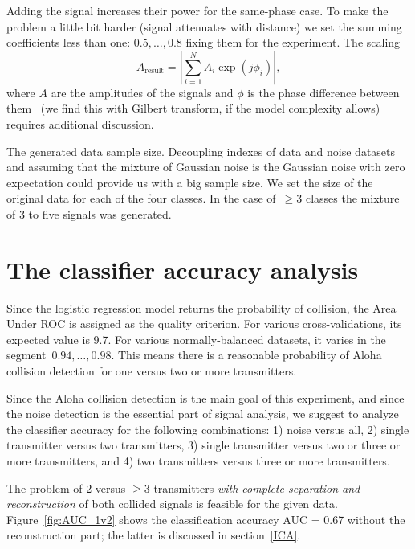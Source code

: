\documentclass[12pt]{article}
\begin{document}
Adding the signal increases their power for the same-phase case. To make the problem a little bit harder (signal attenuates with distance) we set the summing coefficients less than one: $0.5,\ldots,0.8$ fixing them for the experiment. The scaling \[A_\text{result} = \left| \sum_{i=1}^{N} A_i \exp({j\phi_i}) \right|,\] where $A$ are the amplitudes of the signals and $\phi$ is the phase difference between them~\cite{Balanis2005} (we find this with Gilbert transform, if the model complexity allows)  requires additional discussion.

The generated data sample size. Decoupling indexes of data and noise datasets and assuming that the mixture of Gaussian noise is the Gaussian noise with zero expectation could provide us with a big sample size. We set the size of the original data for each of the four classes.  In the case of~$\geq 3$ classes the mixture of 3 to five signals was generated.

\section{The classifier accuracy analysis}

Since the logistic regression model returns the probability of collision, the Area Under ROC is assigned as the quality criterion. For various cross-validations, its expected value is 9.7. For various normally-balanced datasets, it varies in the segment~$0.94,\ldots,0.98$. This means there is a reasonable probability of Aloha collision detection for one versus two or more transmitters. 

Since the Aloha collision detection is the main goal of this experiment, and since the noise detection is the essential part of signal analysis, we suggest to analyze the classifier accuracy for the following combinations:
1) noise versus all, 2) single transmitter versus two transmitters, 3) single transmitter versus two or three or more transmitters, and 4) two transmitters versus three or more transmitters. 

The problem of 2 versus $\geq 3$ transmitters \emph{with complete separation and reconstruction} of both collided signals is feasible for the given data. Figure~\ref{fig:AUC_1v2} shows the classification accuracy AUC = 0.67 without the reconstruction part; the latter is discussed in section~\ref{ICA}.
\end{document}
